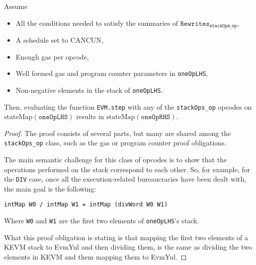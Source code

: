 \begin{theorem}\label{thm:step_oneOp}
\leanok
{}

Assume

\begin{itemize}
\item All the conditions needed to satisfy the summaries of
  $\texttt{Rewrites}_{\texttt{stackOps_op}}$,
\item A schedule set to CANCUN,
\item Enough gas per opcode,
\item Well formed gas and program counter parameters in \texttt{oneOpLHS},
\item Non-negative elements in the stack of \texttt{oneOpLHS}.
\end{itemize}

Then, evaluating the function \texttt{EVM.step} with any of the
\texttt{stackOps_op} opcodes on $\text{stateMap}(\texttt{oneOpLHS})$ results in
$\text{stateMap}(\texttt{oneOpRHS})$.

\end{theorem}

\begin{proof}

The proof consists of several parts, but many are shared among the
\texttt{stackOps_op} class, such as the gas or program counter proof
obligations.

The main semantic challenge for this class of opcodes is to show that the
operations performed on the stack correspond to each other. So, for example, for
the \texttt{DIV} case, once all the execution-related bureaucracies have been
dealt with, the main goal is the following:

\begin{verbatim}
intMap W0 / intMap W1 = intMap (divWord W0 W1)
\end{verbatim}

Where \texttt{W0} and \texttt{W1} are the first two elements of
\texttt{oneOpLHS}'s stack.

What this proof obligation is stating is that mapping the first two elements of
a KEVM stack to EvmYul and then dividing them, is the same as dividing the two
elements in KEVM and them mapping them to EvmYul.

\end{proof}

